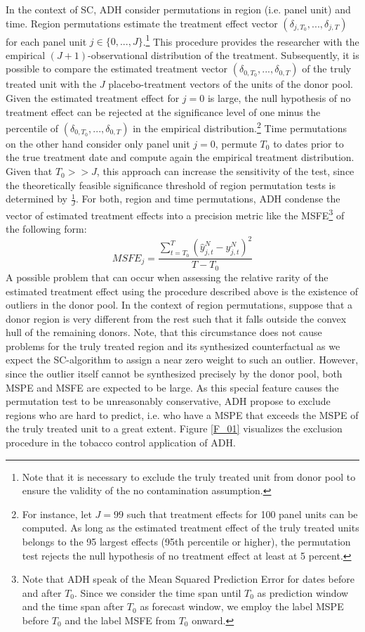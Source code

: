 In the context of \ac{SC}, \ac{ADH} consider permutations in region (i.e. panel unit) and time. Region permutations estimate the treatment effect vector $(\delta_{j,T_0}, ..., \delta_{j,T})$ for each panel unit $j \in \{0, ..., J \}$.\footnote{Note that it is necessary to exclude the truly treated unit from donor pool to ensure the validity of the no contamination assumption.} This procedure provides the researcher with the empirical $(J+1)$-observational distribution of the treatment. Subsequently, it is possible to compare the estimated treatment vector $(\delta_{0,T_0}, ..., \delta_{0,T})$ of the truly treated unit with the $J$ placebo-treatment vectors of the units of the donor pool. Given the estimated treatment effect for $j=0$ is large, the null hypothesis of no treatment effect can be rejected at the significance level of one minus the percentile of $(\delta_{0,T_0}, ..., \delta_{0,T})$ in the empirical distribution.\footnote{For instance, let $J = 99$ such that treatment effects for 100 panel units can be computed. As long as the estimated treatment effect of the truly treated units belongs to the 95 largest effects (95th percentile or higher), the permutation test rejects the null hypothesis of no treatment effect at least at 5 percent.} Time permutations on the other hand consider only panel unit $j = 0$, permute $T_0$ to dates prior to the true treatment date and compute again the empirical treatment distribution. Given that $T_0 >> J$, this approach can increase the sensitivity of the test, since the theoretically feasible significance threshold of region permutation tests is determined by $\frac{1}{J}$. For both, region and time permutations, \ac{ADH} condense the vector of estimated treatment effects into a precision metric like the \ac{MSFE}\footnote{Note that \ac{ADH} speak of the Mean Squared Prediction Error for dates before and after $T_0$. Since we consider the time span until $T_0$ as prediction window and the time span after $T_0$ as forecast window, we employ the label \ac{MSPE} before $T_0$ and the label \ac{MSFE} from $T_0$ onward.} of the following form:
\[
MSFE_j = \frac{\sum_{t = T_0}^{T} \left(\widehat{y}_{j,t}^N - y_{j,t}^N\right) ^2}{T- T_0}
\]
A possible problem that can occur when assessing the relative rarity of the estimated treatment effect using the procedure described above is the existence of outliers in the donor pool. In the context of region permutations, suppose that a donor region is very different from the rest such that it falls outside the convex hull of the remaining donors. Note, that this circumstance does not cause problems for the truly treated region and its synthesized counterfactual as we expect the \ac{SC}-algorithm to assign a near zero weight to such an outlier. However, since the outlier itself cannot be synthesized precisely by the donor pool, both \ac{MSPE} and \ac{MSFE} are expected to be large. As this special feature causes the permutation test to be unreasonably conservative, \ac{ADH} propose to exclude regions who are hard to predict, i.e. who have a \ac{MSPE} that exceeds the \ac{MSPE} of the truly treated unit to a great extent. Figure \ref{F_01} visualizes the exclusion procedure in the tobacco control application of \ac{ADH}. 

